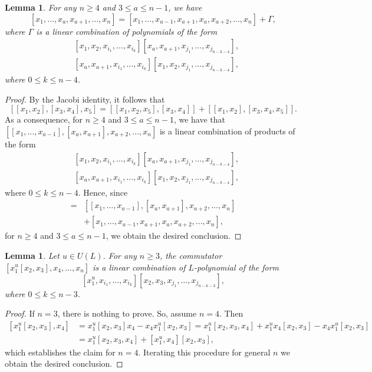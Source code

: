 \documentclass[a4paper,reqno]{amsart}
\newtheorem{lemma}[theorem]{Lemma}
\theoremstyle{definition}
\numberwithin{equation}{section}
\numberwithin{theorem}{section}
\begin{document}
\begin{lemma}\label{lem: ordered comm}
For any $n\geq 4 $ and $3\leq a\leq n-1$, we have
$$
[x_1,\ldots, x_a,x_{a+1}, \ldots, x_{n}]= [x_1,\ldots, x_{a-1}, x_{a+1},x_{a}, x_{a+2}, \ldots, x_{n}] + \Gamma,
$$
where $\Gamma$ is a linear combination of polynomials of the form
\begin{align*}
    &[x_1,x_2, x_{i_1}, \ldots, x_{i_k}][x_a,x_{a+1}, x_{j_1}, \ldots, x_{j_{n-k-4}}],\\
    &[x_a,x_{a+1}, x_{i_1}, \ldots, x_{i_{k}}][x_1,x_2, x_{j_1}, \ldots, x_{j_{n-k-4}}],
\end{align*}
where $0\leq k \leq n-4$.  
\end{lemma}
\begin{proof}
    By the Jacobi identity, it follows that
$$
[[x_1,x_2],[x_3,x_4],x_5]=[[x_1,x_2,x_5],[x_3,x_4]]+ [[x_1,x_2],[x_3,x_4,x_5]].
$$
As a consequence, for $n\geq 4$ and $3\leq a\leq n-1$, we have that $[[x_1,\ldots, x_{a-1}], [x_a,x_{a+1}], x_{a+2}, \ldots, x_{n}]$ is a linear combination of products of the form
\begin{align*}
    &[x_1,x_2, x_{i_1}, \ldots, x_{i_k}][x_a,x_{a+1}, x_{j_1}, \ldots, x_{j_{n-k-4}}],\\
    &[x_a,x_{a+1}, x_{i_1}, \ldots, x_{i_{k}}][x_1,x_2, x_{j_1}, \ldots, x_{j_{n-k-4}}],
\end{align*}
where $0\leq k \leq n-4$.
Hence, since
\begin{align*}
    [x_1,\ldots, x_a,x_{a+1}, \ldots, x_{n}]= &[[x_1,\ldots, x_{a-1}], [x_a,x_{a+1}], x_{a+2}, \ldots, x_{n}] \nonumber\\
    &+[x_1,\ldots, x_{a-1}, x_{a+1},x_{a}, x_{a+2}, \ldots, x_{n}],
\end{align*}
for $n\geq 4$ and $3\leq a \leq n-1$, we obtain the desired conclusion. 
\end{proof}

\begin{lemma}\label{lem: x_1^u[x_2,x_3]}
    Let $u\in U(L)$. For any $n\geq 3$, the commutator $[x_1^u[x_2,x_3],x_4, \ldots , x_n]$ is a linear combination of $L$-polynomial of the form
    $$[x_{1}^u,x_{i_1},\dots,x_{i_k}][x_{2}, x_3, x_{j_1},\dots,x_{j_{n-k-3}}],$$ where $0\leq k\leq n-3$.
\end{lemma}
\begin{proof}
    If $n=3$, there is nothing to prove. So, assume $n=4$. Then
    \begin{equation*}
    \begin{split}
          [x_1^u[x_2,x_3],x_4]&= x_1^u[x_2,x_3]x_4- x_4x_1^u[x_2,x_3] = x_1^u[x_2,x_3,x_4]+ x_1^u x_4[x_2,x_3]- x_4x_1^u[x_2,x_3]\\
          &=x_1^u[x_2,x_3,x_4]+ [x_1^u ,x_4][x_2,x_3],
    \end{split}
    \end{equation*}
    which establishes the claim for $n=4$.
    Iterating this procedure for general $n$ we obtain the desired conclusion.
\end{proof}
\end{document}
